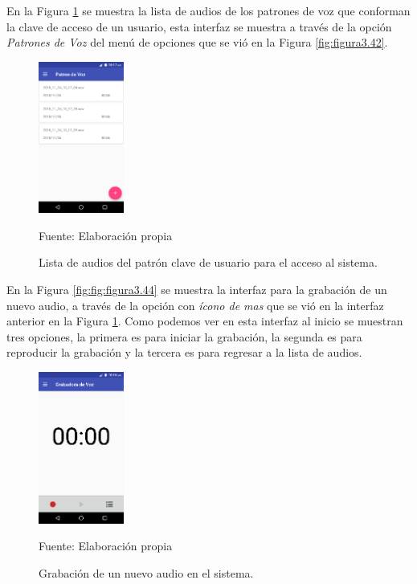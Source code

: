 En la Figura \ref{fig:figura3.43} se muestra la lista de audios de los patrones de voz que conforman la clave de acceso de un usuario, esta interfaz se muestra a través de la opción \textit{Patrones de Voz} del menú de opciones que se vió en la Figura \ref{fig:figura3.42}.
\begin{figure}[H]
\captionsetup{justification=centering}
\begin{center}
\includegraphics[width=0.25\textwidth]{Imagenes/Cap3/image043}
\end{center}
\begin{center}
\vskip -0.5cm
\caption{\small{Lista de audios del patrón clave de usuario para el acceso al sistema.}}
\label{fig:figura3.43}
{\small{Fuente: Elaboración propia}}
\end{center}
\end{figure}

En la Figura \ref{fig:fig:figura3.44} se muestra la interfaz para la grabación de un nuevo audio, a través de la opción con \textit{ícono de mas} que se vió en la interfaz anterior en la Figura \ref{fig:figura3.43}. Como podemos ver en esta interfaz al inicio se muestran tres opciones, la primera es para iniciar la grabación, la segunda es para reproducir la grabación y la tercera es para regresar a la lista de audios.
\begin{figure}[H]
\captionsetup{justification=centering}
\begin{center}
\includegraphics[width=0.25\textwidth]{Imagenes/Cap3/image044}
\end{center}
\begin{center}
\vskip -0.5cm
\caption{\small{Grabación de un nuevo audio en el sistema.}}
\label{fig:figura3.44}
{\small{Fuente: Elaboración propia}}
\end{center}
\end{figure}

